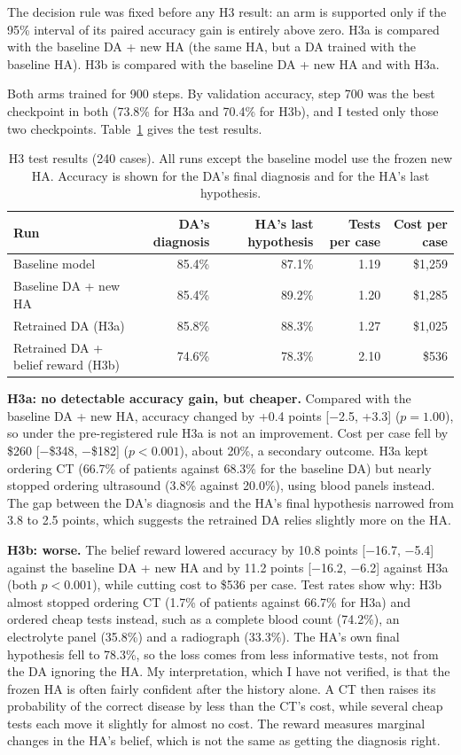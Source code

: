 \documentclass[11pt]{article}
\begin{document}
The decision rule was fixed before any H3 result: an arm is supported only if the
95\% interval of its paired accuracy gain is entirely above zero. H3a is compared
with the baseline DA + new HA (the same HA, but a DA trained with the baseline HA).
H3b is compared with the baseline DA + new HA and with H3a.

Both arms trained for 900 steps. By validation accuracy, step 700 was the best
checkpoint in both (73.8\% for H3a and 70.4\% for H3b), and I tested only those
two checkpoints. Table~\ref{tab:h3} gives the test results.

\begin{table}[ht]
  \centering
  \caption{H3 test results (240 cases). All runs except the baseline model use
  the frozen new HA. Accuracy is shown for the DA's final diagnosis and for the
  HA's last hypothesis.}
  \label{tab:h3}
  \small
  \begin{tabular}{lrrrr}
    \toprule
    Run & DA's diagnosis & HA's last hypothesis & Tests per case & Cost per case \\
    \midrule
    Baseline model & 85.4\% & 87.1\% & 1.19 & \$1,259 \\
    Baseline DA + new HA & 85.4\% & 89.2\% & 1.20 & \$1,285 \\
    Retrained DA (H3a) & 85.8\% & 88.3\% & 1.27 & \$1,025 \\
    Retrained DA + belief reward (H3b) & 74.6\% & 78.3\% & 2.10 & \$536 \\
    \bottomrule
  \end{tabular}
\end{table}

\textbf{H3a: no detectable accuracy gain, but cheaper.} Compared with the baseline DA + new HA,
accuracy changed by +0.4 points [$-$2.5, +3.3] ($p = 1.00$), so under the
pre-registered rule H3a is not an improvement. Cost per case fell by \$260
[$-$\$348, $-$\$182] ($p < 0.001$), about 20\%, a secondary outcome. H3a kept
ordering CT (66.7\% of patients against 68.3\% for the baseline DA) but nearly stopped
ordering ultrasound (3.8\% against 20.0\%), using blood panels instead. The gap
between the DA's diagnosis and the HA's final hypothesis narrowed from 3.8 to
2.5 points, which suggests the retrained DA relies slightly more on the HA.

\textbf{H3b: worse.} The belief reward lowered accuracy by 10.8 points
[$-$16.7, $-$5.4] against the baseline DA + new HA and by 11.2 points [$-$16.2, $-$6.2] against
H3a (both $p < 0.001$), while cutting cost to \$536 per case. Test rates show
why: H3b almost stopped ordering CT (1.7\% of patients against 66.7\% for H3a)
and ordered cheap tests instead, such as a complete blood count (74.2\%), an
electrolyte panel (35.8\%) and a radiograph (33.3\%). The HA's own final
hypothesis fell to 78.3\%, so the loss comes from less informative tests, not
from the DA ignoring the HA. My interpretation, which I have not verified, is
that the frozen HA is often fairly confident after the history alone. A CT then
raises its probability of the correct disease by less than the CT's cost, while
several cheap tests each move it slightly for almost no cost. The reward
measures marginal changes in the HA's belief, which is not the same as getting
the diagnosis right.
\end{document}
